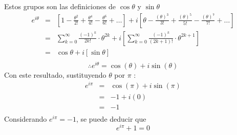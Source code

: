 \documentclass[12pt]{article}
\begin{document}
Estos grupos son las definiciones de $\cos\theta$ y $\sin\theta$
\begin{eqnarray}
e^{i\theta} \nonumber
& = &  [1 - \frac{\theta^2}{2!} + \frac{\theta^4}{4!}- \frac{\theta^6}{6!} + \ldots ]+i[\theta   - \frac{(\theta)^3}{3!}+ \frac{(\theta)^5}{5!} - \frac{(\theta)^7}{7!}+ \ldots]  \nonumber
\\
& = & \sum_{k=0}^{\infty}\frac{(-1)^{k}}{2k!} \cdot \theta ^{2k} +i [\sum_{k=0}^{\infty}\frac{(-1)^{k}}{(2k+1)!} \cdot \theta ^{2k+1}] \nonumber
\\
& = & \cos\theta +i [\sin\theta] \nonumber
\\ \nonumber
\end{eqnarray}
\[
\therefore e^{i\theta} = \cos(\theta) + i \sin(\theta)
\]
Con este resultado, sustituyendo $\theta$ por $\pi$ :
\begin{eqnarray}
e^{i\pi} \nonumber
& = &  \cos(\pi) + i \sin(\pi) \nonumber
\\
& = &  -1 + i (0) \nonumber
\\
& = &  -1\nonumber
\\ \nonumber
\end{eqnarray}
Considerando $e^{i\pi} = -1$, se puede deducir que 
\[
e^{i\pi} +1 = 0
\]
\end{document}
